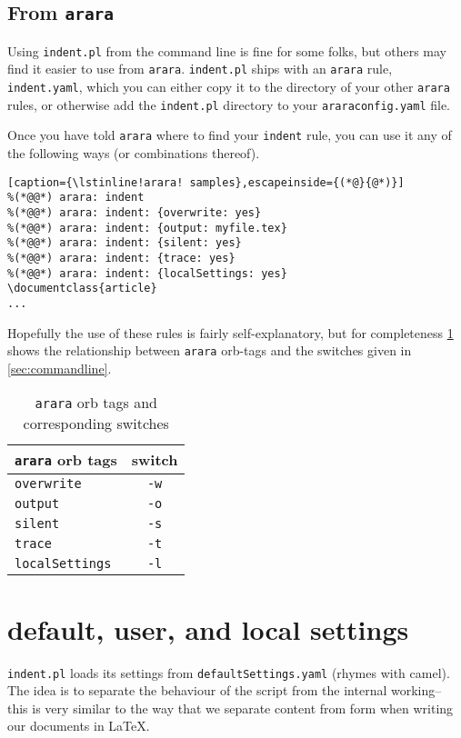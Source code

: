  \subsection{From \lstinline!arara!}
 	Using \lstinline!indent.pl! from the command line is fine for some folks, but
 	others may find it easier to use from \lstinline!arara!. \lstinline!indent.pl!
 	ships with an \lstinline!arara! rule, \lstinline!indent.yaml!, which you can either copy it to the directory of
 	your other \lstinline!arara! rules, or otherwise add the \lstinline!indent.pl!
 	directory to your \lstinline!araraconfig.yaml! file.
 	 	
 	Once you have told \lstinline!arara! where to find your \lstinline!indent! rule, 
 	you can use it any of the following ways (or combinations thereof). 
 	 	
 	\begin{lstlisting}[caption={\lstinline!arara! samples},escapeinside={(*@}{@*)}]
%(*@@*) arara: indent
%(*@@*) arara: indent: {overwrite: yes}
%(*@@*) arara: indent: {output: myfile.tex}
%(*@@*) arara: indent: {silent: yes}
%(*@@*) arara: indent: {trace: yes}
%(*@@*) arara: indent: {localSettings: yes}
\documentclass{article}
...
 	\end{lstlisting}
 	 	
 	Hopefully the use of these rules is fairly self-explanatory, but for completeness
 	\cref{tab:orbsandswitches} shows the relationship between \lstinline!arara! orb-tags and the 
 	switches given in \cref{sec:commandline}.
 	 	
 	\begin{table}[!ht]
 		\centering
 		\caption{\lstinline!arara! orb tags and corresponding switches}
 		\label{tab:orbsandswitches}
 		\begin{tabular}{lc}
 			\toprule
 			\lstinline!arara! orb tags & switch         \\
 			\midrule
 			\lstinline!overwrite!      & \lstinline!-w! \\
 			\lstinline!output!         & \lstinline!-o! \\
 			\lstinline!silent!         & \lstinline!-s! \\
 			\lstinline!trace!          & \lstinline!-t! \\
 			\lstinline!localSettings!  & \lstinline!-l! \\
 			\bottomrule
 		\end{tabular}
 	\end{table}
\section{default, user, and local settings}\label{sec:defuseloc}
 \lstinline!indent.pl! loads its settings from \lstinline!defaultSettings.yaml! 
 (rhymes with camel). The idea is to separate the behaviour of the script 
 from the internal working-- this is very similar to the way that we separate content
 from form when writing our documents in \LaTeX.
  
